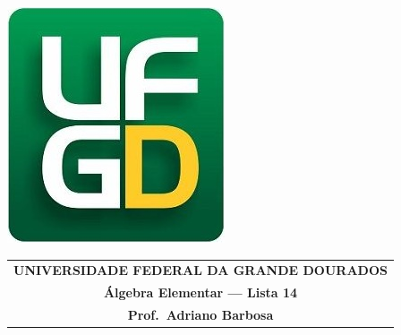 \documentclass[a4paper,5pt]{amsbook}
\begin{document}
\thispagestyle{empty}
\pagestyle{empty}
\begin{minipage}[h]{0.14\textwidth}
	\includegraphics[scale=0.24]{../ufgd.png}
\end{minipage}
\begin{minipage}[h]{\textwidth}
\begin{tabular}{c}
{{\bf UNIVERSIDADE FEDERAL DA GRANDE DOURADOS}}\\
{{\bf \'Algebra Elementar --- Lista 14}}\\
{{\bf Prof.\ Adriano Barbosa}}\\
\end{tabular}
\vspace{-0.45cm}
%
\end{minipage}

\end{document}
